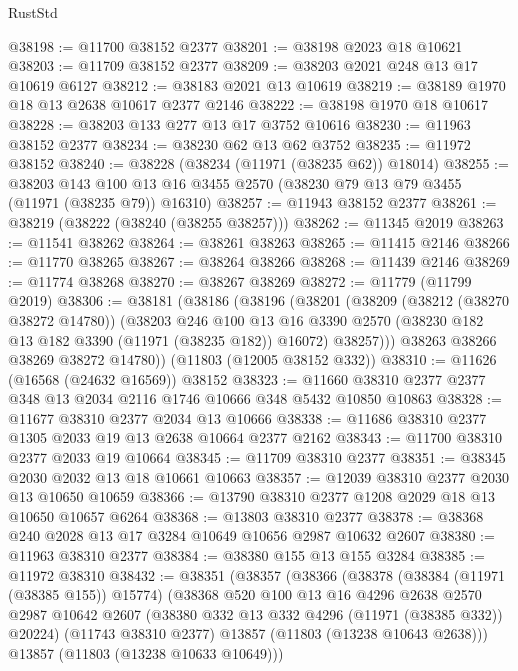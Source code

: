 \begin{lexlean}{RustStd}
\begin{coremodule}
@38198 := @11700 @38152 @2377
@38201 := @38198 @2023 @18 @10621
@38203 := @11709 @38152 @2377
@38209 := @38203 @2021 @248 @13 @17 @10619 @6127
@38212 := @38183 @2021 @13 @10619
@38219 := @38189 @1970 @18 @13 @2638 @10617 @2377 @2146
@38222 := @38198 @1970 @18 @10617
@38228 := @38203 @133 @277 @13 @17 @3752 @10616
@38230 := @11963 @38152 @2377
@38234 := @38230 @62 @13 @62 @3752
@38235 := @11972 @38152
@38240 := @38228 (@38234 (@11971 (@38235 @62)) @18014)
@38255 := @38203
    @143
    @100
    @13
    @16
    @3455
    @2570
    (@38230 @79 @13 @79 @3455 (@11971 (@38235 @79)) @16310)
@38257 := @11943 @38152 @2377
@38261 := @38219 (@38222 (@38240 (@38255 @38257)))
@38262 := @11345 @2019
@38263 := @11541 @38262
@38264 := @38261 @38263
@38265 := @11415 @2146
@38266 := @11770 @38265
@38267 := @38264 @38266
@38268 := @11439 @2146
@38269 := @11774 @38268
@38270 := @38267 @38269
@38272 := @11779 (@11799 @2019)
@38306 := @38181
    (@38186
      (@38196
        (@38201
          (@38209
            (@38212 (@38270 @38272 @14780))
            (@38203
              @246
              @100
              @13
              @16
              @3390
              @2570
              (@38230 @182 @13 @182 @3390 (@11971 (@38235 @182)) @16072)
              @38257)))
        @38263
        @38266
        @38269
        @38272
        @14780))
    (@11803 (@12005 @38152 @332))
@38310 := @11626 (@16568 (@24632 @16569)) @38152
@38323 := @11660 @38310 @2377 @2377 @348 @13 @2034 @2116 @1746 @10666 @348 @5432 @10850 @10863
@38328 := @11677 @38310 @2377 @2034 @13 @10666
@38338 := @11686 @38310 @2377 @1305 @2033 @19 @13 @2638 @10664 @2377 @2162
@38343 := @11700 @38310 @2377 @2033 @19 @10664
@38345 := @11709 @38310 @2377
@38351 := @38345 @2030 @2032 @13 @18 @10661 @10663
@38357 := @12039 @38310 @2377 @2030 @13 @10650 @10659
@38366 := @13790 @38310 @2377 @1208 @2029 @18 @13 @10650 @10657 @6264
@38368 := @13803 @38310 @2377
@38378 := @38368 @240 @2028 @13 @17 @3284 @10649 @10656 @2987 @10632 @2607
@38380 := @11963 @38310 @2377
@38384 := @38380 @155 @13 @155 @3284
@38385 := @11972 @38310
@38432 := @38351
    (@38357
      (@38366
        (@38378
          (@38384 (@11971 (@38385 @155)) @15774)
          (@38368
            @520
            @100
            @13
            @16
            @4296
            @2638
            @2570
            @2987
            @10642
            @2607
            (@38380 @332 @13 @332 @4296 (@11971 (@38385 @332)) @20224)
            (@11743 @38310 @2377)
            @13857
            (@11803 (@13238 @10643 @2638)))
          @13857
          (@11803 (@13238 @10633 @10649)))

\end{coremodule}
\end{lexlean}
